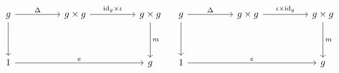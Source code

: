\begin{figure}[H]
\centering

\[ \begin{array}{cc}
\begin{tikzcd}[column sep=huge, row sep=huge]
	g \arrow[r, "\Delta"] \arrow[d] & g \times g \arrow[r, "\textrm{id}_g \times \iota"] & g \times g \arrow[d, "m"]\\
	1 \arrow[rr, "e"] & & g
\end{tikzcd}

&

\begin{tikzcd}[column sep=huge, row sep=huge]
	g \arrow[r, "\Delta"] \arrow[d] & g \times g \arrow[r, "\iota \times \textrm{id}_g"] & g \times g \arrow[d, "m"]\\
	1 \arrow[rr, "e"] & & g
\end{tikzcd}
\end{array} \]

\end{figure}